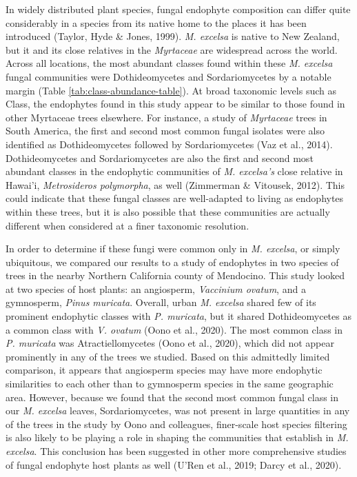 \documentclass[fleqn,10pt,lineno]{wlpeerj} %
\begin{document}
In widely distributed plant species, fungal endophyte composition can differ quite considerably in a species from its native home to the places it has been introduced (Taylor, Hyde \& Jones, 1999). \emph{M. excelsa} is native to New Zealand, but it and its close relatives in the \emph{Myrtaceae} are widespread across the world. Across all locations, the most abundant classes found within these \emph{M. excelsa} fungal communities were Dothideomycetes and Sordariomycetes by a notable margin (Table \ref{tab:class-abundance-table}). At broad taxonomic levels such as Class, the endophytes found in this study appear to be similar to those found in other Myrtaceae trees elsewhere. For instance, a study of \emph{Myrtaceae} trees in South America, the first and second most common fungal isolates were also identified as Dothideomycetes followed by Sordariomycetes (Vaz et al., 2014). Dothideomycetes and Sordariomycetes are also the first and second most abundant classes in the endophytic communities of \emph{M. excelsa's} close relative in Hawai'i, \emph{Metrosideros polymorpha}, as well (Zimmerman \& Vitousek, 2012). This could indicate that these fungal classes are well-adapted to living as endophytes within these trees, but it is also possible that these communities are actually different when considered at a finer taxonomic resolution.

In order to determine if these fungi were common only in \emph{M. excelsa}, or simply ubiquitous, we compared our results to a study of endophytes in two species of trees in the nearby Northern California county of Mendocino. This study looked at two species of host plants: an angiosperm, \emph{Vaccinium ovatum}, and a gymnosperm, \emph{Pinus muricata}. Overall, urban \emph{M. excelsa} shared few of its prominent endophytic classes with \emph{P. muricata}, but it shared Dothideomycetes as a common class with \emph{V. ovatum} (Oono et al., 2020). The most common class in \emph{P. muricata} was Atractiellomycetes (Oono et al., 2020), which did not appear prominently in any of the trees we studied. Based on this admittedly limited comparison, it appears that angiosperm species may have more endophytic similarities to each other than to gymnosperm species in the same geographic area. However, because we found that the second most common fungal class in our \emph{M. excelsa} leaves, Sordariomycetes, was not present in large quantities in any of the trees in the study by Oono and colleagues, finer-scale host species filtering is also likely to be playing a role in shaping the communities that establish in \emph{M. excelsa}. This conclusion has been suggested in other more comprehensive studies of fungal endophyte host plants as well (U'Ren et al., 2019; Darcy et al., 2020).
\end{document}

